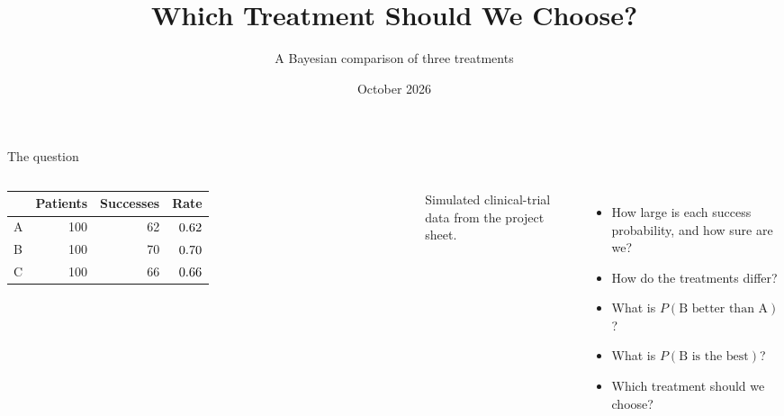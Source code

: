 \documentclass[aspectratio=169,11pt]{beamer}
\title{Which Treatment Should We Choose?}
\subtitle{A Bayesian comparison of three treatments}
\author{\projectauthors}
\institute{MA 232 Bayesian Statistical Methods \textbullet{} Group Project 2}
\date{October 2026}
\begin{document}
\begin{frame}
\titlepage
{}
\end{frame}

\begin{frame}{The question}
\begin{columns}[T]
\begin{tabular}{lrrr}
\toprule
 & Patients & Successes & Rate\\
\midrule
\textcolor{tA}{A} & 100 & 62 & $0.62$\\
\textcolor{tB}{B} & 100 & 70 & $0.70$\\
\textcolor{tC}{C} & 100 & 66 & $0.66$\\
\bottomrule
\end{tabular}

\vspace{1em}
\textcolor{ink2}{\small Simulated clinical-trial data from the project sheet.}
\begin{itemize}
\item How large is each success probability, and how sure are we?
\item How do the treatments differ?
\item What is $P(\text{B better than A})$?
\item What is $P(\text{B is the best})$?
\item Which treatment should we choose?
\end{itemize}
\end{columns}
\end{frame}
\end{document}
